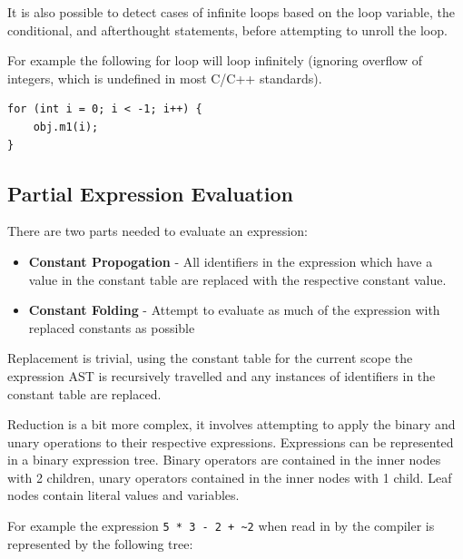 It is also possible to detect cases of infinite loops based on the loop variable, 
the conditional, and afterthought statements, before attempting to unroll the loop.

For example the following for loop will loop infinitely (ignoring overflow of integers, which is undefined in most C/C++ standards).
\begin{lstlisting}[style=myGPC]
for (int i = 0; i < -1; i++) {
    obj.m1(i);
}
\end{lstlisting}


\subsection{Partial Expression Evaluation}
\label{sub:partial}

There are two parts needed to evaluate an expression:

\begin{itemize}
    \item \textbf{Constant Propogation}\cite{sccp} - All identifiers in the expression which have a value in the constant table are
          replaced with the respective constant value.

    \item \textbf{Constant Folding}\cite{sccp} - Attempt to evaluate as much of the expression with replaced constants as possible

\end{itemize}

Replacement is trivial, using the constant table for the current scope the
expression AST is recursively travelled and any instances of identifiers
in the constant table are replaced.


Reduction is a bit more complex, it involves attempting to apply the binary
and unary operations to their respective expressions. Expressions can be
represented in a binary expression tree. Binary operators are contained in
the inner nodes with 2 children, unary operators contained in the inner
nodes with 1 child. Leaf nodes contain literal values and variables.

For example the expression \texttt{5 * 3 - 2 + \textasciitilde2} when read in by the
compiler is represented by the following tree:

